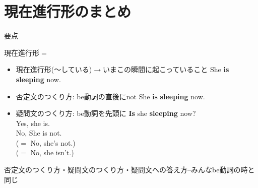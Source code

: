 \documentclass[aspectratio=169,xcolor={dvipsnames,table}]{beamer}
\begin{document}
\section{現在進行形のまとめ}
\begin{frame}[plain]{要点}
 
\begin{block}{現在進行形$=$\,\,}
\begin{itemize}[square]\small
 \item 現在進行形(〜している)$\longrightarrow$いまこの瞬間に起こっていること%
\hfill{She {\bfseries is sleeping} now.}
 \item 否定文のつくり方: be動詞の直後にnot
\hfill{}{She {\bfseries is}  {\bfseries sleeping} now.}
 \item 疑問文のつくり方: be動詞を先頭に
\hfill{}{{\bfseries Is} she {\bfseries sleeping} now?}\\
\hfill{}Yes, she is.\\
\hfill{}No, She is not.\\
\hfill{}($=$ No, she's not.)\\
\hfill{}($=$ No, she isn't.)
\end{itemize}
\end{block}
\hfill{{\scriptsize 否定文のつくり方・疑問文のつくり方・疑問文への答え方--みんなbe動詞の時と同じ}}
\end{frame}
\end{document}
